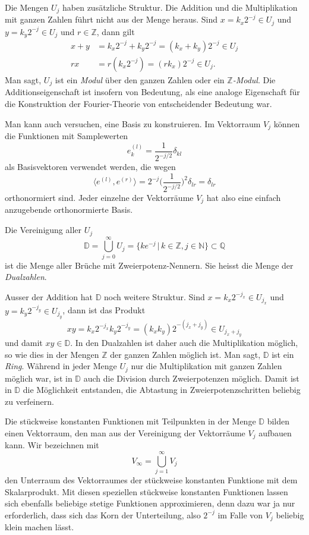 Die Mengen $U_j$ haben zusätzliche Struktur.
Die Addition und die Multiplikation mit ganzen Zahlen führt nicht aus
der Menge heraus.
Sind $x=k_x2^{-j}\in U_j$ und $y=k_y2^{-j}\in U_j$ und $r\in\mathbb Z$,
dann gilt
\begin{align*}
x+y &= k_x 2^{-j}+k_y2^{-j}=(k_x+k_y)2^{-j}\in U_j
\\
rx&=r(k_x2^{-j}) = (rk_x)2^{-j}\in U_j.
\end{align*}
Man sagt, $U_j$ ist ein {\em Modul} über den ganzen Zahlen oder ein
{\em $\mathbb Z$-Modul}.
Die Additionseigenschaft ist insofern von Bedeutung, als eine analoge
Eigenschaft für die Konstruktion der Fourier-Theorie von entscheidender
Bedeutung war.

Man kann auch versuchen, eine Basis zu konstruieren.
Im Vektorraum $V_j$ können die Funktionen mit Samplewerten
\[
e^{(l)}_k = \frac{1}{2^{-j/2}}\delta_{kl}
\]
als Basisvektoren verwendet werden, die wegen
\[
\langle e^{(l)},e^{(r)}\rangle
=
2^{-j}
\biggl(
\frac{1}{2^{-j/2}}
\biggr)^2\delta_{lr}
=
\delta_{lr}
\]
orthonormiert sind.
Jeder einzelne der Vektorräume $V_j$ hat also eine einfach anzugebende
orthonormierte Basis.

Die Vereinigung aller $U_j$ 
\[
\mathbb D
=
\bigcup_{j=0}^\infty U_j
=
\{ ke^{-j}\,|\, k\in\mathbb Z, j\in\mathbb N\}
\subset
\mathbb Q
\]
ist die Menge aller Brüche mit Zweierpotenz-Nennern.
Sie heisst die Menge der {\em Dualzahlen}.


Ausser der Addition hat 
$\mathbb D$ noch weitere Struktur.
Sind $x = k_x2^{-j_x}\in U_{j_x}$ und $y=k_y2^{-j_y}\in U_{j_y}$, dann
ist das Produkt
\[
xy = k_x2^{-j_x} k_y2^{-j_y}=(k_xk_y)2^{-(j_x+j_y)}\in U_{j_x+j_y}
\]
und damit $xy\in\mathbb D$.
In den Dualzahlen ist daher auch die Multiplikation möglich, so wie
dies in der Mengen $\mathbb Z$ der ganzen Zahlen möglich ist.
Man sagt, $\mathbb D$ ist ein {\em Ring}.
%
Während in jeder Menge $U_j$ nur die Multiplikation mit ganzen Zahlen
möglich war, ist in $\mathbb D$ auch die Division durch Zweierpotenzen
möglich.
Damit ist in $\mathbb D$ die Möglichkeit entstanden, die Abtastung
in Zweierpotenzschritten beliebig zu verfeinern.

Die stückweise konstanten Funktionen mit Teilpunkten in der Menge
$\mathbb D$ bilden einen Vektorraum, den man aus der Vereinigung
der Vektorräume $V_j$ aufbauen kann.
Wir bezeichnen mit
\[
V_\infty = \bigcup_{j=1}^\infty V_j 
\]
den Unterraum des Vektorraumes der stückweise konstanten Funktione mit
dem Skalarprodukt.
Mit diesen speziellen stückweise konstanten Funktionen lassen sich ebenfalls
beliebige stetige Funktionen approximieren, denn dazu war ja nur 
erforderlich, dass sich das Korn der Unterteilung, also $2^{-j}$ im Falle
von $V_j$ beliebig klein machen lässt.

